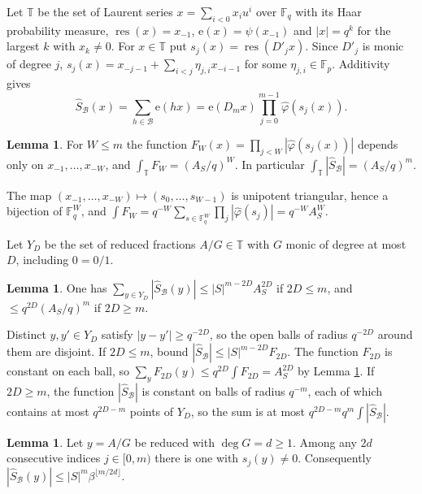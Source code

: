 \documentclass[11pt]{amsart}
\makeatletter
\theoremstyle{definition}
\newtheorem{lemma}[theorem]{Lemma}
\renewenvironment{proof}[1][\proofname]{\par\pushQED{\qed}\normalfont\topsep6\p@\@plus6\p@\relax\trivlist\item[\hskip\labelsep\upshape #1\@addpunct{.}]\ignorespaces}{\popQED\endtrivlist\@endpefalse}
\newcommand{\F}{\mathbb{F}}
\newcommand{\T}{\mathbb{T}}
\newcommand{\cB}{\mathcal{B}}
\newcommand{\res}{\operatorname{res}}
\newcommand{\e}{\mathrm{e}}
\makeatother
\begin{document}
Let $\T$ be the set of Laurent series $x=\sum_{i<0}x_iu^i$ over $\F_q$ with its Haar probability measure, $\res(x)=x_{-1}$, $\e(x)=\psi(x_{-1})$ and $|x|=q^k$ for the largest $k$ with $x_k\ne0$. For $x\in\T$ put $s_j(x)=\res(D'_jx)$. Since $D'_j$ is monic of degree $j$, $s_j(x)=x_{-j-1}+\sum_{i<j}\eta_{j,i}x_{-i-1}$ for some $\eta_{j,i}\in\F_p$. Additivity gives
\[
\hat S_\cB(x)=\sum_{h\in\cB}\e(hx)=\e(D_mx)\prod_{j=0}^{m-1}\hat\varphi(s_j(x)).
\]

\begin{lemma}\label{lem:l1}
For $W\le m$ the function $F_W(x)=\prod_{j<W}|\hat\varphi(s_j(x))|$ depends only on $x_{-1},\dots,x_{-W}$, and $\int_\T F_W=(A_S/q)^W$. In particular $\int_\T|\hat S_\cB|=(A_S/q)^m$.
\end{lemma}

\begin{proof}
The map $(x_{-1},\dots,x_{-W})\mapsto(s_0,\dots,s_{W-1})$ is unipotent triangular, hence a bijection of $\F_q^W$, and $\int F_W=q^{-W}\sum_{s\in\F_q^W}\prod_j|\hat\varphi(s_j)|=q^{-W}A_S^W$.
\end{proof}

Let $Y_D$ be the set of reduced fractions $A/G\in\T$ with $G$ monic of degree at most $D$, including $0=0/1$.

\begin{lemma}\label{lem:farey}
One has $\sum_{y\in Y_D}|\hat S_\cB(y)|\le|S|^{m-2D}A_S^{2D}$ if $2D\le m$, and $\le q^{2D}(A_S/q)^m$ if $2D\ge m$.
\end{lemma}

\begin{proof}
Distinct $y,y'\in Y_D$ satisfy $|y-y'|\ge q^{-2D}$, so the open balls of radius $q^{-2D}$ around them are disjoint. If $2D\le m$, bound $|\hat S_\cB|\le|S|^{m-2D}F_{2D}$. The function $F_{2D}$ is constant on each ball, so $\sum_yF_{2D}(y)\le q^{2D}\int F_{2D}=A_S^{2D}$ by Lemma \ref{lem:l1}. If $2D\ge m$, the function $|\hat S_\cB|$ is constant on balls of radius $q^{-m}$, each of which contains at most $q^{2D-m}$ points of $Y_D$, so the sum is at most $q^{2D-m}q^m\int|\hat S_\cB|$.
\end{proof}

\begin{lemma}\label{lem:linf}
Let $y=A/G$ be reduced with $\deg G=d\ge1$. Among any $2d$ consecutive indices $j\in[0,m)$ there is one with $s_j(y)\ne0$. Consequently $|\hat S_\cB(y)|\le|S|^m\beta^{\lfloor m/2d\rfloor}$.
\end{lemma}
\end{document}
